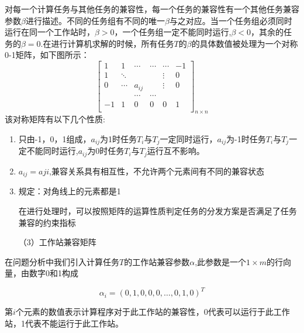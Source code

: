 \documentclass{MathorCupmodeling}
\begin{document}
对每一个计算任务与其他任务的兼容性，每一个任务的兼容性有一个其他任务兼容参数$\beta$进行描述。不同的任务组有不同的唯一$\beta$与之对应。当一个任务组必须同时运行在同一个工作站时，$\beta>0$，一个任务组一定不能同时运行,$\beta<0$，其余的任务的$\beta=0$.在进行计算机求解的时候，所有任务$T$的$\beta$的具体数值被处理为一个对称0-1矩阵，如下图所示：
\begin{equation}
{\begin{bmatrix}1&1&\cdots&\cdots&\cdots&-1\\1&\ddots&&&\vdots&0\\0&\cdots&a_{ij}&&\vdots&0\\&&\cdots&\cdots&&\\-1&1&0&0&0&1\\\end{bmatrix}}_{n\times n}
\end{equation}
该对称矩阵有以下几个性质:


\begin{enumerate}
\item 只由-1，0，1组成，$a_{ij}$为1时任务$T_i$与$T_j$一定同时运行，$a_{ij}$为-1时任务$T_i$与$T_j$一定不能同时运行,$a_{ij}$为0时任务$T_i$与$T_j$运行互不影响。

\item$a_{ij}=a{ji}$,兼容关系具有相互性，不允许两个元素间有不同的兼容状态

\item 规定：对角线上的元素都是1

在进行处理时，可以按照矩阵的运算性质判定任务的分发方案是否满足了任务兼容的约束指标

（3）工作站兼容矩阵
\end{enumerate}
在问题分析中我们引入计算任务$T$的工作站兼容参数$\alpha$,此参数是一个$1\times m$的行向量，由数字0和1构成

\begin{equation}

\alpha_i=(0,1,0,0,0,\dots,0,1,0)^{T}

\end{equation}

第$i$个元素的数值表示计算程序对于此工作站的兼容性，0代表可以运行于此工作站，1代表不能运行于此工作站。
\end{document}
